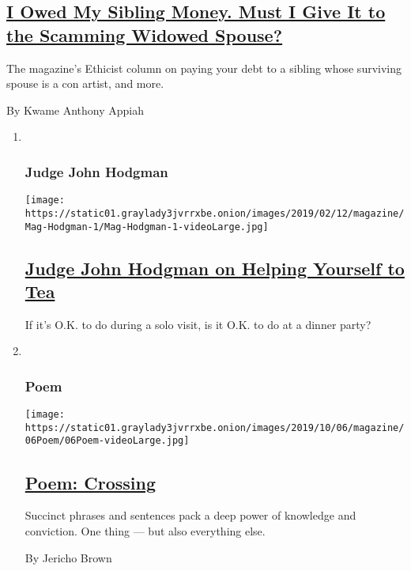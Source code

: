 \begin{enumerate}
{  \subsection{\texorpdfstring{\href{/2019/10/01/magazine/06mag-ethicist.html}{I
  Owed My Sibling Money. Must I Give It to the Scamming Widowed
  Spouse?}}{I Owed My Sibling Money. Must I Give It to the Scamming Widowed Spouse?}}\label{i-owed-my-sibling-money-must-i-give-it-to-the-scamming-widowed-spouse}}

  The magazine's Ethicist column on paying your debt to a sibling whose
  surviving spouse is a con artist, and more.

  By Kwame Anthony Appiah
\end{enumerate}

\begin{enumerate}
\def\labelenumi{\arabic{enumi}.}
\item ~
  \hypertarget{judge-john-hodgman}{%
  \subsubsection{Judge John Hodgman}\label{judge-john-hodgman}}

  \texttt{[image: https://static01.graylady3jvrrxbe.onion/images/2019/02/12/magazine/Mag-Hodgman-1/Mag-Hodgman-1-videoLarge.jpg]}

  \hypertarget{judge-john-hodgman-on-helping-yourself-to-tea}{%
  \subsection{\texorpdfstring{\href{/2019/10/03/magazine/judge-john-hodgman-on-helping-yourself-to-tea.html}{Judge
  John Hodgman on Helping Yourself to
  Tea}}{Judge John Hodgman on Helping Yourself to Tea}}\label{judge-john-hodgman-on-helping-yourself-to-tea}}

  If it's O.K. to do during a solo visit, is it O.K. to do at a dinner
  party?
\item ~
  \hypertarget{poem}{%
  \subsubsection{Poem}\label{poem}}

  \texttt{[image: https://static01.graylady3jvrrxbe.onion/images/2019/10/06/magazine/06Poem/06Poem-videoLarge.jpg]}

  \hypertarget{poem-crossing}{%
  \subsection{\texorpdfstring{\href{/2019/10/03/magazine/poem-crossing.html}{Poem:
  Crossing}}{Poem: Crossing}}\label{poem-crossing}}

  Succinct phrases and sentences pack a deep power of knowledge and
  conviction. One thing --- but also everything else.

  By Jericho Brown
\end{enumerate}

